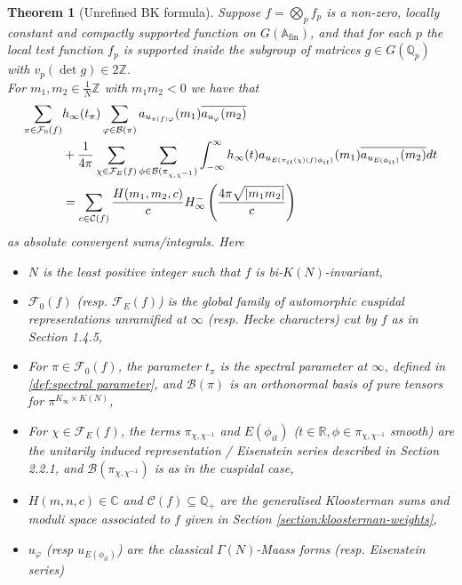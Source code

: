 \documentclass{article}
\newtheorem{theorem}{Theorem}[subsection]
\numberwithin{equation}{section}
\begin{document}
\begin{theorem}[Unrefined BK formula]\label{thm:unrefinedBKformula} Suppose $f=\bigotimes_p f_p$ is a non-zero, locally constant and compactly supported function on $G(\mathbb{A}_{\operatorname{fin}})$, and that for each $p$ the local test function $f_p$ is supported inside the subgroup of matrices $g \in G(\mathbb{Q}_p)$ with $v_p(\det g)\in 2 \mathbb{Z}$.\\
For $m_1,m_2 \in \tfrac{1}{N}\mathbb{Z}$ with $m_1m_2<0$ we have that 
\begin{align}
    \sum_{\pi \in \mathcal{F}_0(f)} & h_\infty(t_\pi)\sum_{\varphi \in \mathcal{B}(\pi)}a_{u_{\pi(f)\varphi}}(m_1)\overline{a_{u_\varphi}(m_2)} \notag \\
    &+\frac{1}{4\pi}\sum_{\chi \in \mathcal{F}_E(f)}\sum_{\phi\in \mathcal{B}(\pi_{\chi,\chi^{-1}})}\int_{-\infty}^{\infty}h_\infty(t)a_{u_{E(\pi_{it}(\chi)(f)\phi_{it})}}(m_1)\overline{a_{u_{E(\phi_{it})}}(m_2)}dt \\
    & = \sum_{c \in \mathcal{C}(f)}\frac{H(m_1,m_2,c)}{c}H_\infty^-\left(\frac{4\pi\sqrt{|m_1m_2|}}{c} \right) \notag
\end{align}
as absolute convergent sums/integrals. Here
    \begin{itemize}[itemsep=-0.2em]
        \item $N$ is the least positive integer such that $f$ is bi-$K(N)$-invariant,
        \item $\mathcal{F}_0(f)$ (resp. $\mathcal{F}_E(f)$) is the global family of automorphic cuspidal representations unramified at $\infty$ (resp. Hecke characters) cut by $f$ as in Section 1.4.5,
        \item For $\pi \in \mathcal{F}_0(f)$, the parameter $t_\pi$ is the spectral parameter at $\infty$, defined in \eqref{def:spectral parameter}, and $\mathcal{B}(\pi)$ is an orthonormal basis of pure tensors for $\pi^{K_\infty\times K(N)}$,
        \item For $\chi \in \mathcal{F}_E(f)$, the terms $\pi_{\chi,\chi^{-1}}$ and $E(\phi_{it})$ ($ t \in \mathbb{R},\phi\in \pi_{\chi,\chi^{-1}}$ smooth) are the unitarily induced representation / Eisenstein series described in Section 2.2.1, and $\mathcal{B}(\pi_{\chi,\chi^{-1}})$ is as in the cuspidal case,
        \item $H(m,n,c)\in \mathbb{C}$ and $\mathcal{C}(f)\subseteq\mathbb{Q}_+$ are the generalised Kloosterman sums and moduli space associated to $f$ given in Section \ref{section:kloosterman-weights},
        \item $u_\varphi$ (resp $u_{E(\phi_{it})}$) are the classical $\Gamma(N)$-Maass forms (resp. Eisenstein series)

\end{itemize}
\end{theorem}
\end{document}

